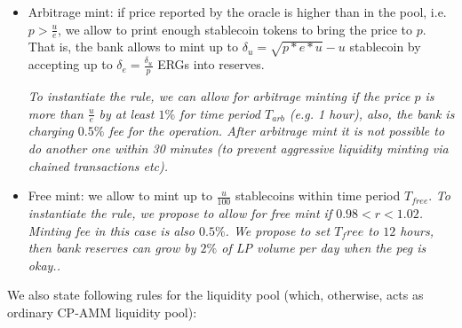 \documentclass{article}   %
\newcommand{\bc}{ERG}
\newcommand{\sct}{stablecoin}
\begin{document}
\begin{itemize}
  \item{Arbitrage mint: } if price reported by the oracle is higher than in the pool, i.e. $p > \frac{u}{e}$, we allow to print enough \sct{} tokens to bring the price to $p$. That is, the bank allows to mint up to $\delta_u = \sqrt{p*e*u}-u$ \sct{} by accepting up to $\delta_e = \frac{\delta_u}{p}$ \bc{}s into reserves. 

  \em{To instantiate the rule, we can allow for arbitrage minting if the price $p$ is more than $\frac{u}{e}$ by at least $1\%$ for time period $T_{arb}$ (e.g. 1 hour), also, the bank is charging $0.5\%$ fee for the operation. After arbitrage mint it is not possible to do another one within 30 minutes (to prevent aggressive liquidity minting via chained transactions etc).}

  \item{Free mint: } we allow to mint up to $\frac{u}{100}$ \sct{}s within time period $T_{free}$. 
  \em{To instantiate the rule, we propose to allow for free mint if $0.98 < r < 1.02$. Minting fee in this case is also $0.5\%$. We propose to set $T_free$ to $12$ hours, then bank reserves can grow by $2\%$ of LP volume per day when the peg is okay.}.
\end{itemize}  

 

We also state following rules for the liquidity pool (which, otherwise, acts as ordinary CP-AMM liquidity pool): 
\end{document}
